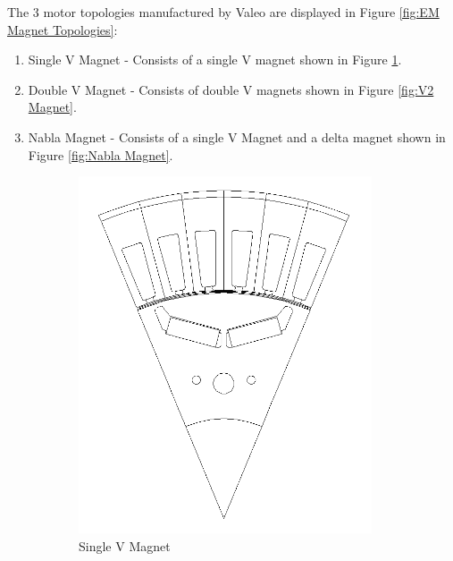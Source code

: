 \documentclass{report} %
\begin{document}
The 3 motor topologies manufactured by Valeo are displayed in Figure \ref{fig:EM Magnet Topologies}:
\begin{enumerate}
    \item Single V Magnet - Consists of a single V magnet shown in Figure \ref{fig:V1 Magnet}.
    \item Double V Magnet - Consists of double V magnets shown in Figure \ref{fig:V2 Magnet}.
    \item Nabla Magnet - Consists of a single V Magnet and a delta magnet shown in Figure \ref{fig:Nabla Magnet}.
\end{enumerate}

\begin{figure}[H]
    \centering
    \begin{subfigure}{0.32\textwidth}
        \centering
        \includegraphics[width=\textwidth]{./ReportImages/1V_Magnet.png}
        \caption{Single V Magnet}
        \label{fig:V1 Magnet}
    \end{subfigure}\hfill
    \begin{subfigure}{0.32\textwidth}
        \centering

\end{subfigure}
\end{figure}
\end{document}
